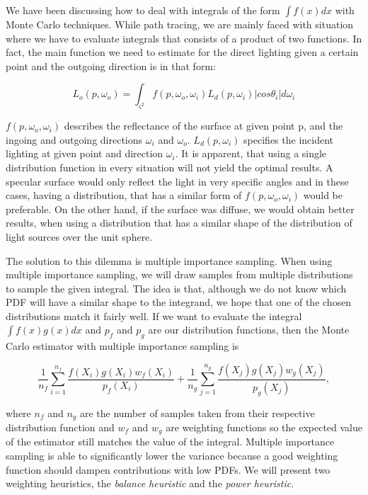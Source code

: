 We have been discussing how to deal with integrals of the form $\int{f(x)dx}$ with Monte Carlo techniques. While path tracing, we are mainly faced with situation where we have to evaluate integrals that consists of a product of two functions. In fact, the main function we need to estimate for the direct lighting given a certain point and the outgoing direction is in that form:

\begin{equation}
L_o(p, \omega_o) = \int_{\varsigma^2}f(p, \omega_o, \omega_i)L_d(p, \omega_i)|cos\theta_i|d\omega_i
\end{equation}

$f(p, \omega_o, \omega_i)$ describes the reflectance of the surface at given point p, and the ingoing and outgoing directions $\omega_i$ and $\omega_o$. $L_d(p, \omega_i)$ specifies the incident lighting at given point and direction $\omega_i$. It is apparent, that using a single distribution function in every situation will not yield the optimal results. A specular surface would only reflect the light in very specific angles and in these cases, having a distribution, that has a similar form of $f(p, \omega_o, \omega_i)$ would be preferable. On the other hand, if the surface was diffuse, we would obtain better results, when using a distribution that has a similar shape of the distribution of light sources over the unit sphere.

The solution to this dilemma is multiple importance sampling. When using multiple importance sampling, we will draw samples from multiple distributions to sample the given integral. The idea is that, although we do not know which PDF will have a similar shape to the integrand, we hope that one of the chosen distributions match it fairly well. If we want to evaluate the integral $\int{f(x)g(x)dx}$ and $p_f$ and $p_g$ are our distribution functions, then the Monte Carlo estimator with multiple importance sampling is

\begin{equation}
\frac{1}{n_f}\sum_{i = 1}^{n_f}{\frac{f(X_i)g(X_i)w_f(X_i)}{p_f(X_i)}}+ \frac{1}{n_g}\sum_{j = 1}^{n_g}{\frac{f(X_j)g(X_j)w_g(X_j)}{p_g(X_j)}},
\end{equation}

where $n_f$ and $n_g$ are the number of samples taken from their respective distribution function and $w_f$ and $w_g$ are weighting functions so the expected value of the estimator still matches the value of the integral. Multiple importance sampling is able to significantly lower the variance because a good weighting function should dampen contributions with low PDFs. We will present two weighting heuristics, the \textit{balance heuristic} and the \textit{power heuristic}.

